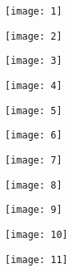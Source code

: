 
\begin{figure}[H]
\centering 
\texttt{[image: 1]} 
\caption{} 
\end{figure} 
\newpage
\begin{figure}[H]
\centering 
\texttt{[image: 2]} 
\caption{} 
\end{figure}  
\newpage

\begin{figure}[H]
\centering 
\texttt{[image: 3]} 
\caption{} 
\end{figure}  
\newpage

\begin{figure}[H]
\centering 
\texttt{[image: 4]} 
\caption{} 
\end{figure}  
\newpage

\begin{figure}[H]
\centering 
\texttt{[image: 5]} 
\caption{} 
\end{figure}  
\newpage

\begin{figure}[H]
\centering 
\texttt{[image: 6]} 
\caption{} 
\end{figure}  
\newpage

\begin{figure}[H]
\centering 
\texttt{[image: 7]} 
\caption{} 
\end{figure}  
\newpage

\begin{figure}[H]
\centering 
\texttt{[image: 8]} 
\caption{} 
\end{figure}  
\newpage

\begin{figure}[H]
\centering 
\texttt{[image: 9]} 
\caption{} 
\end{figure}  
\newpage

\begin{figure}[H]
\centering 
\texttt{[image: 10]} 
\caption{} 
\end{figure}  
\newpage

\begin{figure}[H]
\centering 
\texttt{[image: 11]} 
\caption{} 
\end{figure}  
\newpage

